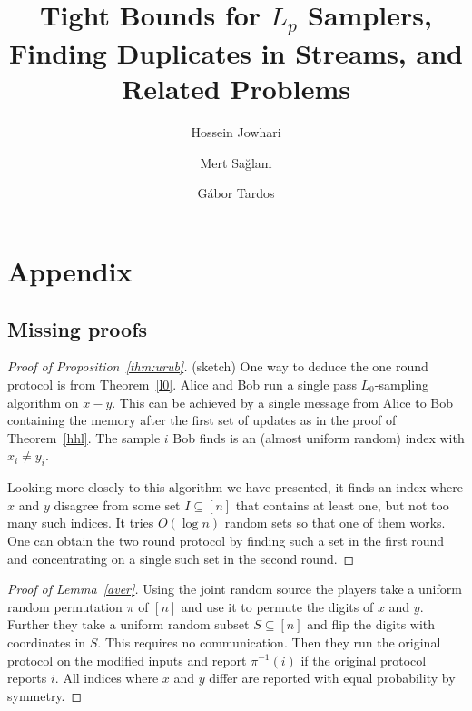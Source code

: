 \documentclass[11pt,letterpaper]{article}
\title{\Large\bf Tight Bounds for $L_p$ Samplers, Finding Duplicates in
  Streams, and Related Problems}
\author[1]{Hossein Jowhari}
\author[1]{Mert Sa\u{g}lam}
\affil[1]{Simon Fraser University, Burnaby, Canada}
\author[1,2]{G\'abor Tardos}
\affil[2]{R\'enyi Institute of Mathematics, Budapest, Hungary}
\date{}
\theoremstyle{remark}
\begin{document}
\maketitle


  










{}



%
%
\newpage
\appendix

\section{Appendix}\label{sec:appx}

\subsection{Missing proofs}

\begin{proof}[Proof of Proposition~\ref{thm:urub}] (sketch) One way to deduce the one round protocol is from
  Theorem~\ref{l0}. Alice and Bob run a single pass $L_0$-sampling algorithm
  on $x-y$. This can be achieved by a single message from Alice to Bob
  containing the memory after the first set of updates as in the proof of
  Theorem~\ref{hhl}. The sample $i$ Bob finds is an (almost uniform random)
  index with $x_i\ne y_i$.

Looking more closely to this algorithm we have presented, it finds an index
where $x$ and $y$ disagree from some set $I\subseteq[n]$ that contains at
least one, but not too many such indices. It tries $O(\log n)$ random sets so
that one of them works. One can obtain the two round
protocol by finding such a set in the first round and concentrating on a
single such set in the second round.
\end{proof}

\begin{proof}[Proof of Lemma~\ref{aver}] Using the joint random source the players take a uniform random
  permutation $\pi$ of $[n]$ and use it to permute the digits of $x$ and
  $y$. Further they take a uniform random subset $S\subseteq[n]$ and flip the
  digits with coordinates in $S$. This requires no communication. 
Then they run the original protocol on the modified inputs and report
$\pi^{-1}(i)$ if the original protocol reports $i$. 
All indices where $x$ and $y$ differ are reported with equal probability by
symmetry.
\end{proof}
\end{document}
